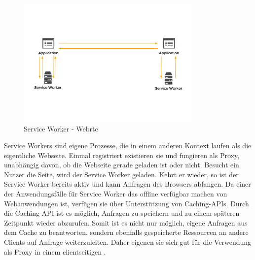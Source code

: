 \begin{figure}[!h]
	\centering
	\includegraphics[width=0.8\textwidth]{figures/service_worker_app}
	\caption[A Figure Short-Title]{Service Worker - Webrtc}
	\label{fig:mesh}
\end{figure}

Service Workers sind eigene Prozesse, die in einem anderen Kontext laufen als die eigentliche Webseite. Einmal registriert existieren sie und fungieren als Proxy, unabhängig davon, ob die Webseite gerade geladen ist oder nicht. Besucht ein Nutzer die Seite, wird der Service Worker geladen. Kehrt er wieder, so ist der Service Worker bereits aktiv und kann Anfragen des Browsers abfangen. Da einer der Anwendungsfälle für Service Worker das offline verfügbar machen von Webanwendungen ist, verfügen sie über Unterstützung von Caching-APIs. Durch die Caching-API ist es möglich, Anfragen zu speichern und zu einem späteren Zeitpunkt wieder abzurufen. Somit ist es nicht nur möglich, eigene Anfragen aus dem Cache zu beantworten, sondern ebenfalls gespeicherte Ressourcen an andere Clients auf Anfrage weiterzuleiten. Daher eigenen sie sich gut für die Verwendung als Proxy in einem clientseitigen \cdn.

